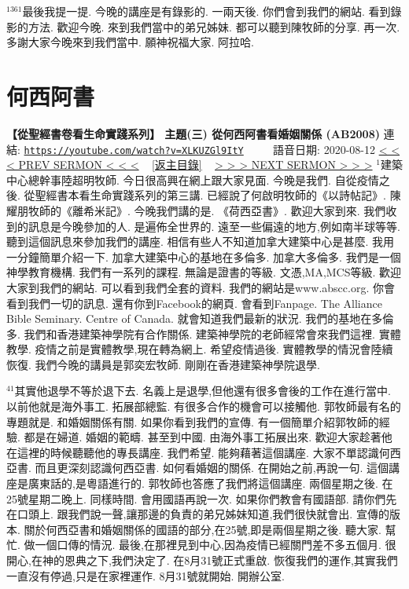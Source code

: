 \documentclass{book}
\begin{document}
$^{1361}$最後我提一提.
今晚的講座是有錄影的.
一兩天後.
你們會到我們的網站.
看到錄影的方法.
歡迎今晚.
來到我們當中的弟兄姊妹.
都可以聽到陳牧師的分享.
再一次.
多謝大家今晚來到我們當中.
願神祝福大家.
阿拉哈.
\newpage



\section{何西阿書}
\label{sec:XLKUZGl9ItY}
\textbf{【從聖經書卷看生命實踐系列】 主題(三) 從何西阿書看婚姻關係 (AB2008)}
\newline
\newline
連結: \href{https://youtube.com/watch?v=XLKUZGl9ItY}{\texttt{https://youtube.com/watch?v=XLKUZGl9ItY}} ~~~~ 語音日期: 2020-08-12
\newline
\newline
\hyperref[sec:P0Y2lvzICsM]{\small{< < < PREV SERMON < < <}}
~
\hyperref[sec:index]{\small{[返主目錄]}}
~
\hyperref[sec:n5DpA1Db_0M]{\small{> > > NEXT SERMON > > >}}
\newline
\newline
$^{1}$建築中心總幹事陸超明牧師.
今日很高興在網上跟大家見面.
今晚是我們.
自從疫情之後.
從聖經書本看生命實踐系列的第三講.
已經說了何啟明牧師的《以詩帖記》.
陳耀朋牧師的《離希米記》.
今晚我們講的是.
《荷西亞書》.
歡迎大家到來.
我們收到的訊息是今晚參加的人.
是遍佈全世界的.
遠至一些偏遠的地方,例如南半球等等.
聽到這個訊息來參加我們的講座.
相信有些人不知道加拿大建築中心是甚麼.
我用一分鐘簡單介紹一下.
加拿大建築中心的基地在多倫多.
加拿大多倫多.
我們是一個神學教育機構.
我們有一系列的課程.
無論是證書的等級.
文憑,MA,MCS等級.
歡迎大家到我們的網站.
可以看到我們全套的資料.
我們的網站是www.abscc.org.
你會看到我們一切的訊息.
還有你到Facebook的網頁.
會看到Fanpage.
The Alliance Bible Seminary.
Centre of Canada.
就會知道我們最新的狀況.
我們的基地在多倫多.
我們和香港建築神學院有合作關係.
建築神學院的老師經常會來我們這裡.
實體教學.
疫情之前是實體教學,現在轉為網上.
希望疫情過後.
實體教學的情況會陸續恢復.
我們今晚的講員是郭奕宏牧師.
剛剛在香港建築神學院退學.

$^{41}$其實他退學不等於退下去.
名義上是退學,但他還有很多會後的工作在進行當中.
以前他就是海外事工.
拓展部總監.
有很多合作的機會可以接觸他.
郭牧師最有名的專題就是.
和婚姻關係有關.
如果你看到我們的宣傳.
有一個簡單介紹郭牧師的經驗.
都是在婦道.
婚姻的範疇.
甚至到中國.
由海外事工拓展出來.
歡迎大家趁著他在這裡的時候聽聽他的專長講座.
我們希望.
能夠藉著這個講座.
大家不單認識何西亞書.
而且更深刻認識何西亞書.
如何看婚姻的關係.
在開始之前,再說一句.
這個講座是廣東話的,是粵語進行的.
郭牧師也答應了我們將這個講座.
兩個星期之後.
在25號星期二晚上.
同樣時間.
會用國語再說一次.
如果你們教會有國語部.
請你們先在口頭上.
跟我們說一聲,讓那邊的負責的弟兄姊妹知道,我們很快就會出.
宣傳的版本.
關於何西亞書和婚姻關係的國語的部分,在25號,即是兩個星期之後.
聽大家.
幫忙.
做一個口傳的情況.
最後,在那裡見到中心,因為疫情已經關門差不多五個月.
很開心,在神的恩典之下,我們決定了.
在8月31號正式重啟.
恢復我們的運作,其實我們一直沒有停過,只是在家裡運作.
8月31號就開始.
開辦公室.
\end{document}
